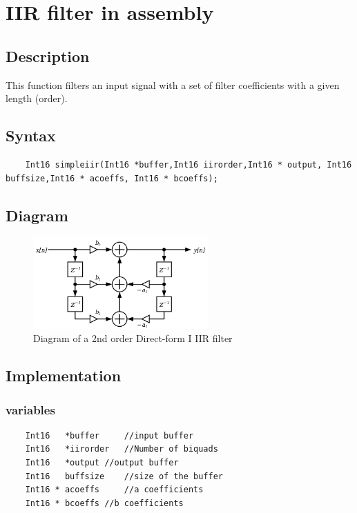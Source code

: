 
\section{IIR filter in assembly}

\subsection{Description}
This function filters an input signal with a set of filter coefficients with a given length (order).

\subsection{Syntax} 
\begin{lstlisting}
	Int16 simpleiir(Int16 *buffer,Int16 iirorder,Int16 * output, Int16 buffsize,Int16 * acoeffs, Int16 * bcoeffs);
\end{lstlisting}

\subsection{Diagram}
\begin{figure}[h]
	\centering
	\includegraphics[width=0.6\textwidth]{../Journal/Code/IIRfilter}
	\caption{Diagram of a 2nd order Direct-form I IIR filter}
	\label{Fig:FIR_filter}
\end{figure}


\subsection{Implementation}

\subsubsection{variables}
\begin{lstlisting}
	Int16 	*buffer 	//input buffer
	Int16	*iirorder	//Number of biquads
	Int16	*output	//output buffer
	Int16 	buffsize	//size of the buffer
	Int16 * acoeffs		//a coefficients
	Int16 * bcoeffs	//b coefficients
\end{lstlisting}

